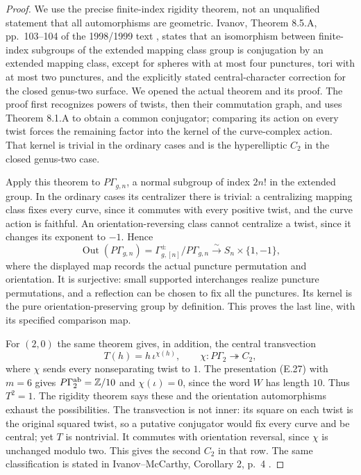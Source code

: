 \begin{proof}
We use the precise finite-index rigidity theorem, not an
unqualified statement that all automorphisms are geometric.
Ivanov, Theorem 8.5.A, pp.~103--104 of the 1998/1999 text
\cite{ET_Ivanov1999}, states that an isomorphism between
finite-index subgroups of the extended mapping class group
is conjugation by an extended mapping class, except for
spheres with at most four punctures, tori with at most two
punctures, and the explicitly stated central-character
correction for the closed genus-two surface.  We opened the
actual theorem and its proof.  The proof first recognizes
powers of twists, then their commutation graph, and uses
Theorem 8.1.A to obtain a common conjugator; comparing its
action on every twist forces the remaining factor into the
kernel of the curve-complex action.  That kernel is trivial
in the ordinary cases and is the hyperelliptic $C_2$ in the
closed genus-two case.

Apply this theorem to $P\Gamma_{g,n}$, a normal subgroup
of index $2n!$ in the extended group.  In the ordinary
cases its centralizer there is trivial: a centralizing
mapping class fixes every curve, since it commutes with
every positive twist, and the curve action is faithful.
An orientation-reversing class cannot centralize a twist,
since it changes its exponent to $-1$.  Hence
\[
 \operatorname{Out}(P\Gamma_{g,n})
   =\Gamma_{g,[n]}^{\pm}/P\Gamma_{g,n}
   \xrightarrow{\sim}S_n\times\{1,-1\},                       \tag{E.35}
\]
where the displayed map records the actual puncture
permutation and orientation.  It is surjective: small
supported interchanges realize puncture permutations,
and a reflection can be chosen to fix all the punctures.
Its kernel is the pure orientation-preserving group by
definition.  This proves the last line, with its specified
comparison map.

For $(2,0)$ the same theorem gives, in addition, the central
transvection
\[
 T(h)=h\,\iota^{\chi(h)},
 \qquad \chi:P\Gamma_2\twoheadrightarrow C_2,                  \tag{E.36}
\]
where $\chi$ sends every nonseparating twist to $1$.
The presentation (E.27) with $m=6$ gives
$P\Gamma_2^{\rm ab}=\mathbb Z/10$ and
$\chi(\iota)=0$, since the word $W$ has length $10$.
Thus $T^2=1$.  The rigidity theorem says these and the
orientation automorphisms exhaust the possibilities.
The transvection is not inner: its square on each twist
is the original squared twist, so a putative conjugator
would fix every curve and be central; yet $T$ is nontrivial.
It commutes with orientation reversal, since $\chi$ is
unchanged modulo two.  This gives the second $C_2$ in that
row.  The same classification is stated in
Ivanov--McCarthy, Corollary 2, p.~4
\cite{ET_IvanovMcCarthy1999}.


\end{proof}
